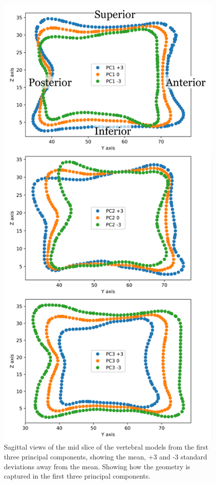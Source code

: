 \begin{figure}[p]
  \centering
  \includegraphics[width=.65\textwidth]{Chapters/Chapter_PCA_images/PC1_2_3_SagitalSlice.pdf}
  \caption{Sagittal views of the mid slice of the vertebral models from the first three principal components, showing the mean, +3 and -3 standard deviations away from the mean. Showing how the geometry is captured in the first three principal components.}
  \label{fig:PC1_2_3_SagitalSlice}
\end{figure}

